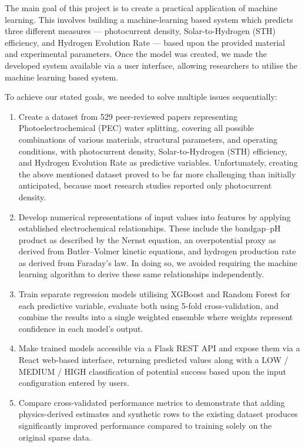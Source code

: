 The main goal of this project is to create a practical application of machine
learning.
This involves building a machine-learning based system which predicts three
different measures --- photocurrent density, Solar-to-Hydrogen (STH) efficiency,
and Hydrogen Evolution Rate --- based upon the provided material and experimental
parameters.
Once the model was created, we made the developed system available via a user
interface, allowing researchers to utilise the machine learning based system.

To achieve our stated goals, we needed to solve multiple issues sequentially:

\begin{enumerate}
  \item Create a dataset from 529 peer-reviewed papers representing
        Photoelectrochemical (PEC) water splitting, covering all possible
        combinations of various materials, structural parameters, and operating
        conditions, with photocurrent density, Solar-to-Hydrogen (STH) efficiency,
        and Hydrogen Evolution Rate as predictive variables.
        Unfortunately, creating the above mentioned dataset proved to be far more
        challenging than initially anticipated, because most research studies
        reported only photocurrent density.

  \item Develop numerical representations of input values into features by
        applying established electrochemical relationships.
        These include the bandgap--pH product as described by the Nernst equation,
        an overpotential proxy as derived from Butler--Volmer kinetic equations,
        and hydrogen production rate as derived from Faraday's law.
        In doing so, we avoided requiring the machine learning algorithm to derive
        these same relationships independently.

  \item Train separate regression models utilising XGBoost and Random Forest
        for each predictive variable, evaluate both using 5-fold cross-validation,
        and combine the results into a single weighted ensemble where weights
        represent confidence in each model's output.

  \item Make trained models accessible via a Flask REST API and expose them
        via a React web-based interface, returning predicted values along with
        a LOW / MEDIUM / HIGH classification of potential success based upon
        the input configuration entered by users.

  \item Compare cross-validated performance metrics to demonstrate that adding
        physics-derived estimates and synthetic rows to the existing dataset
        produces significantly improved performance compared to training solely
        on the original sparse data.
\end{enumerate}

